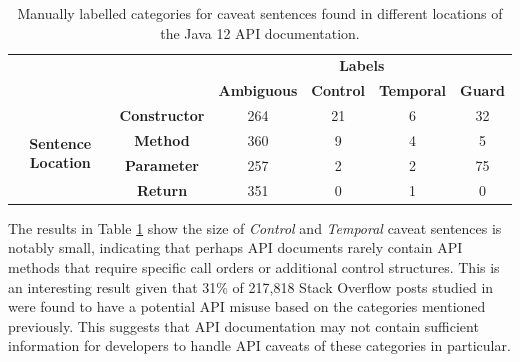 \begin{table}[]
	\begin{tabular}{|cc|cccc|}
		\hline
		&  & \multicolumn{4}{c|}{\textbf{Labels}} \\ \cline{3-6} 
		&  & \textbf{Ambiguous} & \textbf{Control} & \textbf{Temporal} & \textbf{Guard} \\ \hline
		\multicolumn{1}{|c|}{\multirow{4}{*}{\textbf{Sentence Location}}} & \textbf{Constructor} & 264 & 21 & 6 & 32 \\ \cline{2-6} 
		\multicolumn{1}{|c|}{} & \textbf{Method} & 360 & 9 & 4 & 5 \\ \cline{2-6} 
		\multicolumn{1}{|c|}{} & \textbf{Parameter} & 257 & 2 & 2 & 75 \\ \cline{2-6} 
		\multicolumn{1}{|c|}{} & \textbf{Return} & 351 & 0 & 1 & 0 \\ \hline
	\end{tabular}
	\caption{Manually labelled categories for caveat sentences found in different locations of the Java 12 API documentation.}
	\label{tab:caveat-sent-stats}
\end{table}

The results in Table \ref{tab:caveat-sent-stats} show the size of \textit{Control} and \textit{Temporal} caveat sentences is notably small, indicating that perhaps API documents rarely contain API methods that require specific call orders or additional control structures. This is an interesting result given that 31\% of 217,818 Stack Overflow posts studied in \cite{code-examples} were found to have a potential API misuse based on the categories mentioned previously. This suggests that API documentation may not contain sufficient information for developers to handle API caveats of these categories in particular.

